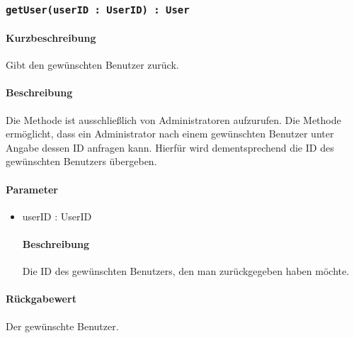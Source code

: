 \subsubsection{\texttt{getUser(userID : UserID) : User}}%
\paragraph*{Kurzbeschreibung}
Gibt den gewünschten Benutzer zurück.
\paragraph*{Beschreibung}
Die Methode ist ausschließlich von Administratoren aufzurufen.
Die Methode ermöglicht, dass ein Administrator nach einem gewünschten Benutzer unter Angabe dessen ID anfragen kann.
Hierfür wird dementsprechend die ID des gewünschten Benutzers übergeben.
\paragraph*{Parameter}
\begin{itemize}
    \item userID : UserID
    		\paragraph*{Beschreibung}
    		Die ID des gewünschten Benutzers, den man zurückgegeben haben möchte.
\end{itemize}
\paragraph*{Rückgabewert}
Der gewünschte Benutzer.
